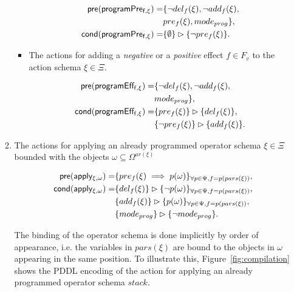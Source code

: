 \documentclass[letterpaper]{article} %
\newcommand{\pre}{\mathsf{pre}}     %
\newcommand{\cond}{\mathsf{cond}}   %
\begin{document}
\begin{itemize}
\begin{enumerate}
\begin{itemize}
\begin{small}
\begin{align*}
\hspace*{7pt}\pre(\mathsf{programPre_{f,\xi}})=&\{\neg del_{f}(\xi),\neg add_{f}(\xi),\\
& pre_{f}(\xi), mode_{prog}\},\\    
\cond(\mathsf{programPre_{f,\xi}})=&\{\emptyset\}\rhd\{\neg pre_{f}(\xi)\}.
\end{align*}
\end{small}

\item The actions for adding a {\em negative} or a {\em positive} effect $f\in F_v$ to the action schema $\xi\in\Xi$.

\begin{small}
\begin{align*}
\hspace*{7pt}\pre(\mathsf{programEff_{f,\xi}})=&\{\neg del_{f}(\xi),\neg add_{f}(\xi),\\                                                   
& mode_{prog}\},\\ 
\cond(\mathsf{programEff_{f,\xi}})=&\{pre_{f}(\xi)\}\rhd\{del_{f}(\xi)\},\\
&\{\neg pre_{f}(\xi)\}\rhd\{add_{f}(\xi)\}.
\end{align*}
\end{small}
\end{itemize}

\item The actions for applying an already programmed operator schema $\xi\in\Xi$ bounded with the objects $\omega\subseteq\Omega^{ar(\xi)}$
\begin{small}
\begin{align*}
\hspace*{7pt}\pre(\mathsf{apply_{\xi,\omega}})=&\{pre_{f}(\xi)\implies p(\omega)\}_{\forall p\in\Psi,f=p(pars(\xi))},\\
\cond(\mathsf{apply_{\xi,\omega}})=&\{del_{f}(\xi)\}\rhd\{\neg p(\omega)\}_{\forall p\in\Psi,f=p(pars(\xi))},\\
&\{add_{f}(\xi)\}\rhd\{p(\omega)\}_{\forall p\in\Psi,f=p(pars(\xi))},\\
&\{mode_{prog}\}\rhd\{\neg mode_{prog}\}.
\end{align*}
\end{small}

The binding of the operator schema is done implicitly by order of appearance, i.e. the variables in $pars(\xi)$ are bound to the objects in $\omega$ appearing in the same position. To illustrate this, Figure~\ref{fig:compilation} shows the PDDL encoding of the action for applying an already programmed operator schema $stack$.


\end{enumerate}
\end{itemize}
\end{document}
